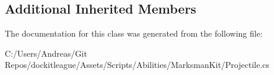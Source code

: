 \subsection*{Additional Inherited Members}


The documentation for this class was generated from the following file\+:\begin{DoxyCompactItemize}
\item 
C\+:/\+Users/\+Andreas/\+Git Repos/dockitleague/\+Assets/\+Scripts/\+Abilities/\+Marksman\+Kit/Projectile.\+cs\end{DoxyCompactItemize}
